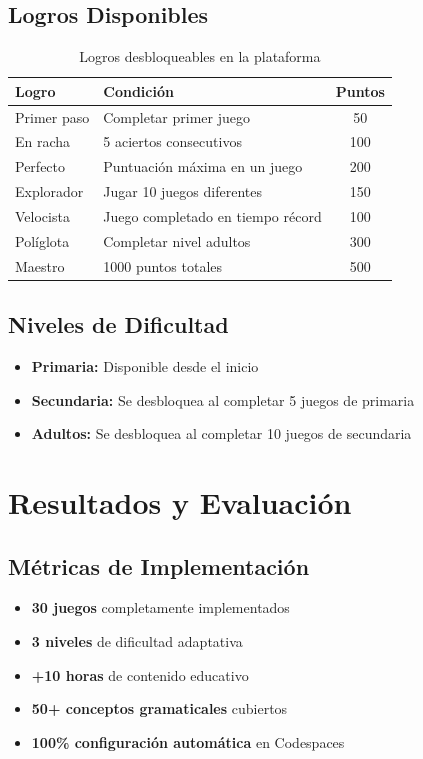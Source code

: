 \documentclass[12pt,a4paper]{article}
\begin{document}
\subsection{Logros Disponibles}

\begin{table}[H]
\centering
\caption{Logros desbloqueables en la plataforma}
\begin{tabular}{|l|l|c|}
\hline
\textbf{Logro} & \textbf{Condición} & \textbf{Puntos} \\
\hline
Primer paso & Completar primer juego & 50 \\
En racha & 5 aciertos consecutivos & 100 \\
Perfecto & Puntuación máxima en un juego & 200 \\
Explorador & Jugar 10 juegos diferentes & 150 \\
Velocista & Juego completado en tiempo récord & 100 \\
Políglota & Completar nivel adultos & 300 \\
Maestro & 1000 puntos totales & 500 \\
\hline
\end{tabular}
\end{table}

\subsection{Niveles de Dificultad}

\begin{itemize}
    \item \textbf{Primaria:} Disponible desde el inicio
    \item \textbf{Secundaria:} Se desbloquea al completar 5 juegos de primaria
    \item \textbf{Adultos:} Se desbloquea al completar 10 juegos de secundaria
\end{itemize}

\section{Resultados y Evaluación}

\subsection{Métricas de Implementación}

\begin{itemize}
    \item \textbf{30 juegos} completamente implementados
    \item \textbf{3 niveles} de dificultad adaptativa
    \item \textbf{+10 horas} de contenido educativo
    \item \textbf{50+ conceptos gramaticales} cubiertos
    \item \textbf{100\% configuración automática} en Codespaces
\end{itemize}
\end{document}
